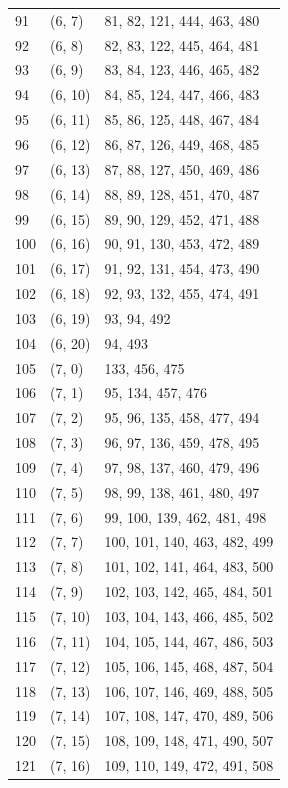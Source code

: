 \documentclass{article}
\begin{document}
\begin{longtable}{lll}
  91 & (6, 7) & 81, 82, 121, 444, 463, 480 \\
  92 & (6, 8) & 82, 83, 122, 445, 464, 481 \\
  93 & (6, 9) & 83, 84, 123, 446, 465, 482 \\
  94 & (6, 10) & 84, 85, 124, 447, 466, 483 \\
  95 & (6, 11) & 85, 86, 125, 448, 467, 484 \\
  96 & (6, 12) & 86, 87, 126, 449, 468, 485 \\
  97 & (6, 13) & 87, 88, 127, 450, 469, 486 \\
  98 & (6, 14) & 88, 89, 128, 451, 470, 487 \\
  99 & (6, 15) & 89, 90, 129, 452, 471, 488 \\
  100 & (6, 16) & 90, 91, 130, 453, 472, 489 \\
  101 & (6, 17) & 91, 92, 131, 454, 473, 490 \\
  102 & (6, 18) & 92, 93, 132, 455, 474, 491 \\
  103 & (6, 19) & 93, 94, 492 \\
  104 & (6, 20) & 94, 493 \\
  105 & (7, 0) & 133, 456, 475 \\
  106 & (7, 1) & 95, 134, 457, 476 \\
  107 & (7, 2) & 95, 96, 135, 458, 477, 494 \\
  108 & (7, 3) & 96, 97, 136, 459, 478, 495 \\
  109 & (7, 4) & 97, 98, 137, 460, 479, 496 \\
  110 & (7, 5) & 98, 99, 138, 461, 480, 497 \\
  111 & (7, 6) & 99, 100, 139, 462, 481, 498 \\
  112 & (7, 7) & 100, 101, 140, 463, 482, 499 \\
  113 & (7, 8) & 101, 102, 141, 464, 483, 500 \\
  114 & (7, 9) & 102, 103, 142, 465, 484, 501 \\
  115 & (7, 10) & 103, 104, 143, 466, 485, 502 \\
  116 & (7, 11) & 104, 105, 144, 467, 486, 503 \\
  117 & (7, 12) & 105, 106, 145, 468, 487, 504 \\
  118 & (7, 13) & 106, 107, 146, 469, 488, 505 \\
  119 & (7, 14) & 107, 108, 147, 470, 489, 506 \\
  120 & (7, 15) & 108, 109, 148, 471, 490, 507 \\
  121 & (7, 16) & 109, 110, 149, 472, 491, 508 \\

\end{longtable}
\end{document}
